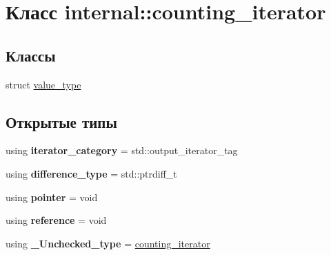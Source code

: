 \hypertarget{classinternal_1_1counting__iterator}{}\section{Класс internal\+:\+:counting\+\_\+iterator}
\label{classinternal_1_1counting__iterator}
\subsection*{Классы}
\begin{DoxyCompactItemize}
\item 
struct \hyperlink{structinternal_1_1counting__iterator_1_1value__type}{value\+\_\+type}
\end{DoxyCompactItemize}
\subsection*{Открытые типы}
\begin{DoxyCompactItemize}
\item 
\mbox{\label{classinternal_1_1counting__iterator_a4cac370bc1e8a31453f5db3d5004818d}} 
using {\bfseries iterator\+\_\+category} = std\+::output\+\_\+iterator\+\_\+tag
\item 
\mbox{\label{classinternal_1_1counting__iterator_a848498fc680182396c23c7f0ba0c3d1b}} 
using {\bfseries difference\+\_\+type} = std\+::ptrdiff\+\_\+t
\item 
\mbox{\label{classinternal_1_1counting__iterator_a69b3e84b55fb7bb6e028c263313d97c3}} 
using {\bfseries pointer} = void
\item 
\mbox{\label{classinternal_1_1counting__iterator_a21d1319eec398dcf0f2d608b6b784429}} 
using {\bfseries reference} = void
\item 
\mbox{\label{classinternal_1_1counting__iterator_ab3a7affafd03e04d98130c62cefa9cc5}} 
using {\bfseries \+\_\+\+Unchecked\+\_\+type} = \hyperlink{classinternal_1_1counting__iterator}{counting\+\_\+iterator}
\end{DoxyCompactItemize}
